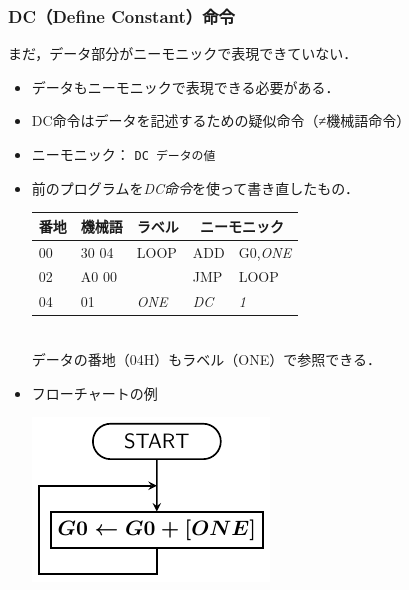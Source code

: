 \documentclass[handout]{beamer}        %
\begin{document}
\begin{frame}
  \frametitle{DC（Define Constant）命令}
  まだ，データ部分がニーモニックで表現できていない．\\
  \vfill

  \begin{itemize}
  \item データもニーモニックで表現できる必要がある．
  \vfill

  \item DC命令はデータを記述するための疑似命令（≠機械語命令） \\
  \vfill

  \item ニーモニック： \texttt{DC データの値}
  \vfill

  \item 前のプログラムを\emph{DC命令}を使って書き直したもの．
    {\ttfamily\footnotesize\begin{center}
      \begin{tabular}{|l|l|l|l l|} \hline
        番地 & 機械語 & ラベル & \multicolumn{2}{|c|}{ニーモニック} \\
        \hline
        00 & 30 04 & LOOP        & ADD        & G0,\emph{ONE} \\
        02 & A0 00 &             & JMP        & LOOP          \\
        04 & 01    & \emph{ONE}  & \emph{DC}  & \emph{1}      \\
        \hline
      \end{tabular}\\
      データの番地（04H）もラベル（ONE）で参照できる．
    \end{center}}
    \vfill

  \item フローチャートの例\\
    \centerline{\includegraphics[scale=0.7]{../Tikz/flow0A.pdf}}
  \end{itemize}
  \vfill

 \end{frame}
\end{document}
